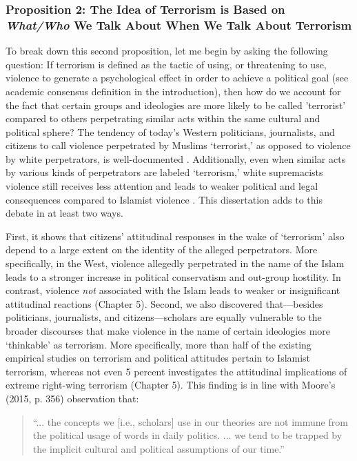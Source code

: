 \subsubsection{Proposition 2: The Idea of Terrorism is Based on \textit{What/Who} We Talk About When We Talk About Terrorism}

To break down this second proposition, let me begin by asking the following question: If terrorism is defined as the tactic of using, or threatening to use, violence to generate a psychological effect in order to achieve a political goal (see academic consensus definition in the introduction), then how do we account for the fact that certain groups and ideologies are more likely to be called 'terrorist' compared to others perpetrating similar acts within the same cultural and political sphere? The tendency of today's Western politicians, journalists, and citizens to call violence perpetrated by Muslims `terrorist,' as opposed to violence by white perpetrators, is well-documented \citep{Kearns2019, Powell2011}. Additionally, even when similar acts by various kinds of perpetrators are labeled `terrorism,' white supremacists violence still receives less attention and leads to weaker political and legal consequences compared to Islamist violence \citep{Malik2020, Meier2019}. This dissertation adds to this debate in at least two ways.


First, it shows that citizens' attitudinal responses in the wake of `terrorism' also depend to a large extent on the identity of the alleged perpetrators. More specifically, in the West, violence allegedly perpetrated in the name of the Islam leads to a stronger increase in political conservatism and out-group hostility. In contrast, violence \textit{not} associated with the Islam leads to weaker or insignificant attitudinal reactions (Chapter 5). Second, we also discovered that---besides politicians, journalists, and citizens---scholars are equally vulnerable to the broader discourses that make violence in the name of certain ideologies more `thinkable' as terrorism. More specifically, more than half of the existing empirical studies on terrorism and political attitudes pertain to Islamist terrorism, whereas not even 5 percent investigates the attitudinal implications of extreme right-wing terrorism (Chapter 5). This finding is in line with Moore's (2015, p. 356) observation that:


\begin{quote}
    ``... the concepts we [i.e., scholars] use in our theories are not immune from the political usage of words in daily politics. ... we tend to be trapped by the implicit cultural and political assumptions of our time.'' 
\end{quote}
\newpage

